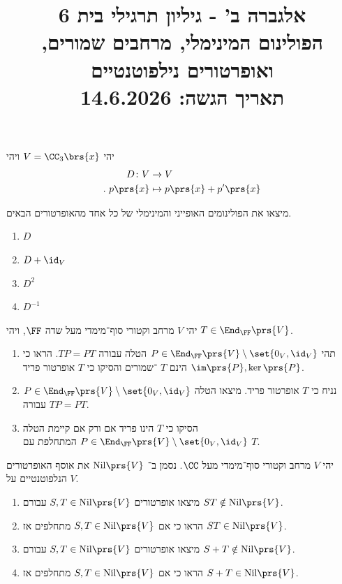 \documentclass[a4paper,10pt,twoside,openany]{article}
\title{
אלגברה ב' - גיליון תרגילי בית 6 \\
הפולינום המינימלי, מרחבים שמורים, ואופרטורים נילפוטנטיים
\\
\vspace{1cm}
\large{תאריך הגשה: 14.6.2026}
}
\date{}
\begin{document}
\maketitle

\begin{exercise}
יהי
$V = \CC_3\brs{x}$
ויהי
\begin{align*}
D \colon V &\to V \\
\text{.} \hphantom{l} p\prs{x} &\mapsto p\prs{x} + p'\prs{x}
\end{align*}

מיצאו את הפולינומים האופייני והמינימלי של כל אחד מהאופרטורים הבאים.

\begin{enumerate}
\item $D$
\item $D + \id_V$
\item $D^2$
\item $D^{-1}$
\end{enumerate}
\end{exercise}

\begin{exercise}
יהי
$V$
מרחב וקטורי סוף־מימדי מעל שדה
$\FF$,
ויהי
$T \in \End_\FF\prs{V}$.
\begin{enumerate}
\item תהי
$P \in \End_\FF\prs{V} \setminus \set{0_V, \id_V}$
הטלה עבורה
$TP = PT$.
הראו כי
$\im\prs{P}, \ker\prs{P}$
הינם
$T$%
־שמורים והסיקו כי
$T$
אופרטור פריד.

\item נניח כי
$T$
אופרטור פריד. מיצאו הטלה
$P \in \End_\FF\prs{V} \setminus \set{0_V, \id_V}$
עבורה
$TP = PT$.

\item הסיקו כי $T$ הינו פריד אם ורק אם קיימת הטלה
$P \in \End_\FF\prs{V} \setminus \set{0_V, \id_V}$
המתחלפת עם
$T$.
\end{enumerate}
\end{exercise}

\begin{exercise}
יהי
$V$
מרחב וקטורי סוף־מימדי מעל
$\CC$.
נסמן ב־%
$\mathrm{Nil}\prs{V}$
את אוסף האופרטורים הנלפוטנטיים על
$V$.

\begin{enumerate}
\item מיצאו אופרטורים
$S,T \in \mathrm{Nil}\prs{V}$
עבורם
$ST \notin \mathrm{Nil}\prs{V}$.

\item הראו כי אם
$S,T \in \mathrm{Nil}\prs{V}$
מתחלפים אז
$ST \in \mathrm{Nil}\prs{V}$.

\item מיצאו אופרטורים
$S,T \in \mathrm{Nil}\prs{V}$
עבורם
$S+T \notin \mathrm{Nil}\prs{V}$.

\item הראו כי אם
$S,T \in \mathrm{Nil}\prs{V}$
מתחלפים אז
$S+T \in \mathrm{Nil}\prs{V}$.
\end{enumerate}
\end{exercise}
\end{document}
